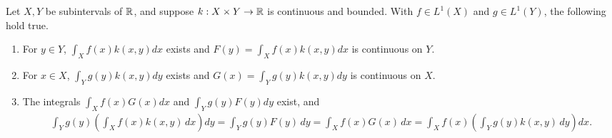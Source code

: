 \begin{theorem}
    Let $X,Y$ be subintervals of $\mathbb{R}$, and suppose $k:X \times Y \to \mathbb{R}$ is continuous and bounded. With $f \in L^{1}(X)$ and $g \in L^{1}(Y)$, the following hold true.
    \begin{enumerate}
        \item For $y \in Y$, $\int_{X}f(x)k(x,y)dx$ exists and $F(y) = \int_{X}f(x)k(x,y)dx$ is continuous on $Y$.
        \item For $x \in X$, $\int_{Y}g(y)k(x,y)dy$ exists and $G(x) = \int_{Y}g(y)k(x,y)dy$ is continuous on $X$.
        \item The integrals $\int_{X}f(x)G(x)dx$ and $\int_{Y}g(y)F(y)dy$ exist, and
        \begin{align}
            \int_{Y}g(y)\left(\int_{X}f(x)k(x,y) \, dx\right)dy = \int_{Y} g(y)F(y) \, dy = \int_{X} f(x)G(x) \, dx = \int_{X}f(x)\left( \int_{Y} g(y)k(x,y) \, dy \right) dx.
        \end{align}
    \end{enumerate}
\end{theorem}

